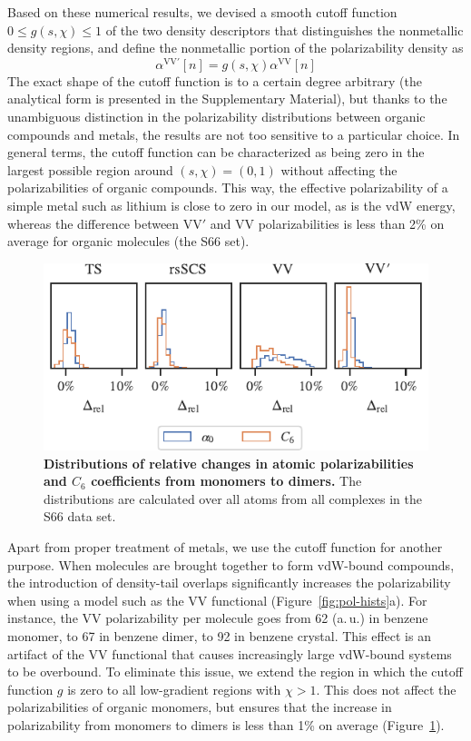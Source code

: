 Based on these numerical results, we devised a smooth cutoff function $0\leq g(s,\chi)\leq 1$ of the two density descriptors that distinguishes the nonmetallic density regions, and define the nonmetallic portion of the polarizability density as
\begin{equation}
  \alpha^\mathrm{VV'}[n]=g(s,\chi)\alpha^\text{VV}[n]
\end{equation}
The exact shape of the cutoff function is to a certain degree arbitrary (the analytical form is presented in the Supplementary Material), but thanks to the unambiguous distinction in the polarizability distributions between organic compounds and metals, the results are not too sensitive to a particular choice.
In general terms, the cutoff function can be characterized as being zero in the largest possible region around $(s,\chi)=(0,1)$ without affecting the polarizabilities of organic compounds.
This way, the effective polarizability of a simple metal such as lithium is close to zero in our model, as is the vdW energy, whereas the difference between VV$'$ and VV polarizabilities is less than 2\% on average for organic molecules (the S66 set).

\begin{figure}[t!]
\centering
\includegraphics{../media/pol-shifts.pdf}
\caption{\textbf{Distributions of relative changes in atomic polarizabilities and $C_6$ coefficients from monomers to dimers.}
The distributions are calculated over all atoms from all complexes in the S66 data set.
}\label{fig:pol-shifts}
\end{figure}

Apart from proper treatment of metals, we use the cutoff function for another purpose.
When molecules are brought together to form vdW-bound compounds, the introduction of density-tail overlaps significantly increases the polarizability when using a model such as the VV functional (Figure~\ref{fig:pol-hists}a).
For instance, the VV polarizability per molecule goes from 62 (a.\,u.) in benzene monomer, to 67 in benzene dimer, to 92 in benzene crystal.
This effect is an artifact of the VV functional that causes increasingly large vdW-bound systems to be overbound.
To eliminate this issue, we extend the region in which the cutoff function $g$ is zero to all low-gradient regions with $\chi>1$.
This does not affect the polarizabilities of organic monomers, but ensures that the increase in polarizability from monomers to dimers is less than 1\% on average (Figure~\ref{fig:pol-shifts}).

